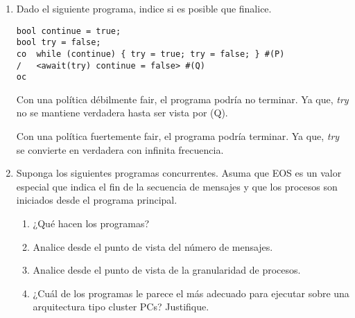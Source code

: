 \documentclass[a4paper, 10pt]{article}
\newenvironment{QandA}{
    \begin{enumerate}\bfseries}
    {\end{enumerate}
}
\newenvironment{answered}{\par\normalfont}{}
\begin{document}
\begin{QandA}
\begin{enumerate}
\begin{answered}
Asignaciones P$_{8} = 128^2 \times 2 + 128 \times 2 = 33024$

Sumas P$_{8} = 128^2 \times 2 = 32768$

Productos P$_{8} = 128^2 \times 2 = 32768$

Tiempo P$_8$ $= 33024 \times 1 ut + 32768 \times 2 ut + 32768 \times 3 = 196864 ut$

Asignaciones P$_{resto} = 128^2 \times 18 + 128 \times 18 = 297216$

Sumas P$_{resto} = 128^2 \times 18 = 294912$

Productos P$_{resto} = 128^2 \times 2 = 294912$

Tiempo P$_{resto}= 297216 \times 1 ut + 294912 \times 2 ut + 294912 \times 3 = 1771776 ut$

Con estos nuevos tiempos el speedup será de 7,1.
\end{answered}
\end{enumerate}

\item Dado el siguiente programa, indice si es posible que finalice.

\begin{lstlisting}
bool continue = true;
bool try = false;
co  while (continue) { try = true; try = false; } #(P)
/   <await(try) continue = false> #(Q)
oc
\end{lstlisting}

\begin{answered}
Con una política débilmente fair, el programa podría no terminar. Ya que, \emph{try} no se mantiene verdadera hasta ser vista por (Q).

Con una política fuertemente fair, el programa podría terminar. Ya que, \emph{try} se convierte en verdadera con infinita frecuencia.
\end{answered}

\item Suponga los siguientes programas concurrentes. Asuma que EOS es un valor especial que indica el fin de la secuencia de mensajes y que los procesos son iniciados desde el programa principal.

\begin{enumerate}
\item ¿Qué hacen los programas?
\item Analice desde el punto de vista del número de mensajes.
\item Analice desde el punto de vista de la granularidad de procesos.
\item ¿Cuál de los programas le parece el más adecuado para ejecutar sobre una arquitectura tipo cluster PCs? Justifique. 
\end{enumerate}


\end{QandA}
\end{document}

